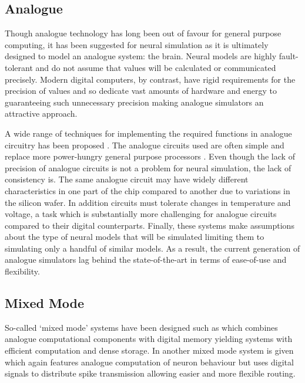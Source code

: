 		\subsection{Analogue}
		
			Though analogue technology has long been out of favour for general purpose
			computing, it has been suggested for neural simulation as it is ultimately
			designed to model an analogue system: the brain. Neural models are highly
			fault-tolerant and do not assume that values will be calculated or
			communicated precisely. Modern digital computers, by contrast, have rigid
			requirements for the precision of values and so dedicate vast amounts of
			hardware and energy to guaranteeing such unnecessary precision making
			analogue simulators an attractive approach.
			
			A wide range of techniques for implementing the required functions in
			analogue circuitry has been proposed
			\cite{graf86,holler89,agranat90,azghadi13}.  The analogue circuits used
			are often simple and replace more power-hungry general purpose
			processors \cite{misra10}. Even though the lack of precision of analogue
			circuits is not a problem for neural simulation, the lack of consistency
			is. The same analogue circuit may have widely different characteristics in
			one part of the chip compared to another due to variations in the silicon
			wafer. In addition circuits must tolerate changes in temperature and
			voltage, a task which is substantially more challenging for analogue
			circuits compared to their digital counterparts.  Finally, these systems
			make assumptions about the type of neural models that will be simulated
			limiting them to simulating only a handful of similar models. As a result,
			the current generation of analogue simulators lag behind the
			state-of-the-art in terms of ease-of-use and flexibility.
		
		\subsection{Mixed Mode}
			
			So-called `mixed mode' systems have been designed such as
			\cite{heittmann02} which combines analogue computational components with
			digital memory yielding systems with efficient computation and dense
			storage. In \cite{murray91} another mixed mode system is given which again
			features analogue computation of neuron behaviour but uses digital signals
			to distribute spike transmission allowing easier and more flexible routing.
			

